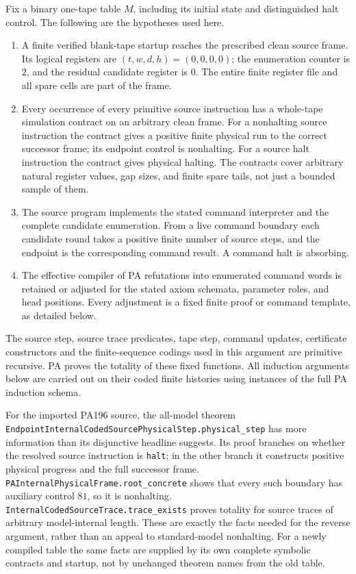 Fix a binary one-tape table $M$, including its initial state and distinguished
halt control.  The following are the hypotheses used here.
\begin{enumerate}
\item A finite verified blank-tape startup reaches the prescribed clean
source frame.  Its logical registers are
$(t,w,d,h)=(0,0,0,0)$; the enumeration counter is $2$, and the residual
candidate register is $0$.  The entire finite register file and all spare
cells are part of the frame.
\item Every occurrence of every primitive source instruction has a
whole-tape simulation contract on an arbitrary clean frame.  For a
nonhalting source instruction the contract gives a positive finite physical
run to the correct successor frame; its endpoint control is nonhalting.
For a source halt instruction the contract gives physical halting.  The
contracts cover arbitrary natural register values, gap sizes, and finite
spare tails, not just a bounded sample of them.
\item The source program implements the stated command interpreter and
the complete candidate enumeration.  From a live command boundary each
candidate round takes a positive finite number of source steps, and the
endpoint is the corresponding command result.  A command halt is absorbing.
\item The effective compiler of PA refutations into enumerated command
words is retained or adjusted for the stated axiom schemata, parameter
roles, and head positions.  Every adjustment is a fixed finite proof or
command template, as detailed below.
\end{enumerate}
The source step, source trace predicates, tape step, command updates,
certificate constructors and the finite-sequence codings used in this
argument are primitive recursive.  PA proves the totality of these fixed
functions.  All induction arguments below are carried out on their coded
finite histories using instances of the full PA induction schema.

For the imported PA196 source, the all-model theorem
\nolinkurl{EndpointInternalCodedSourcePhysicalStep.physical_step} has more
information than its disjunctive headline suggests.  Its proof branches on
whether the resolved source instruction is \texttt{halt}; in the other
branch it constructs positive physical progress and the full successor
frame.  \nolinkurl{PAInternalPhysicalFrame.root_concrete} shows that every
such boundary has auxiliary control $81$, so it is nonhalting.
\nolinkurl{InternalCodedSourceTrace.trace_exists} proves totality for source
traces of arbitrary model-internal length.  These are exactly the facts
needed for the reverse argument, rather than an appeal to standard-model
nonhalting.  For a newly compiled table the same facts are supplied by its
own complete symbolic contracts and startup, not by unchanged theorem
names from the old table.

